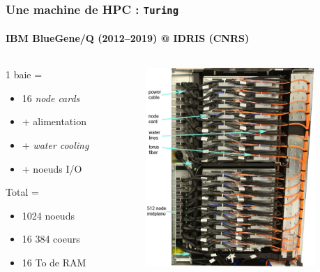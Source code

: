 \documentclass[xcolor={x11names,svgnames}]{beamer}
\begin{document}
\begin{frame}
  \frametitle{Une machine de HPC : \texttt{Turing}}
  \framesubtitle{IBM BlueGene/Q (2012--2019) @ IDRIS (CNRS)}
  
  \begin{columns}
    \begin{column}{0.33\textwidth}
      1 baie =
      \begin{itemize}
      \item 16 \textit{node cards}
      \item + alimentation
      \item + \textit{water cooling}
      \item + noeuds I/O
      \end{itemize}

      \bigskip
      
      Total =
      \begin{itemize}
      \item 1024 noeuds
      \item 16 384 coeurs
      \item 16 To de RAM
      \end{itemize}
      
    \end{column}
      
    \begin{column}{0.66\textwidth}
      \includegraphics[height=7.5cm]{bgqMidplane}
    \end{column}
  \end{columns}
\end{frame}
\end{document}
